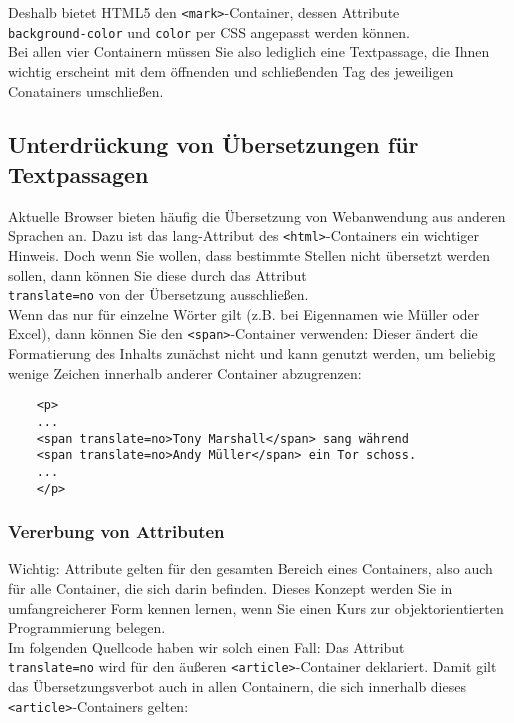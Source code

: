 Deshalb bietet HTML5 den \verb|<mark>|-Container, dessen \glqq{}Attribute\grqq{} \\\verb|background-color| und \verb|color| per CSS angepasst werden können. \\

Bei allen vier Containern müssen Sie also lediglich eine Textpassage, die Ihnen wichtig erscheint mit dem öffnenden und schließenden Tag des jeweiligen Conatainers umschließen.

\subsection{Unterdrückung von Übersetzungen für Textpassagen}

Aktuelle Browser bieten häufig die Übersetzung von Webanwendung aus anderen Sprachen an. Dazu ist das lang-Attribut des \verb|<html>|-Containers ein wichtiger Hinweis. Doch wenn Sie wollen, dass bestimmte Stellen nicht übersetzt werden sollen, dann können Sie diese durch das Attribut \\\verb|translate=no| von der Übersetzung ausschließen.\\

Wenn das nur für einzelne Wörter gilt (z.B. bei Eigennamen wie Müller oder Excel), dann können Sie den \verb|<span>|-Container verwenden: Dieser ändert die Formatierung des Inhalts zunächst nicht und kann genutzt werden, um beliebig wenige Zeichen innerhalb anderer Container abzugrenzen:

\begin{verbatim}
	<p> 
	... 
	<span translate=no>Tony Marshall</span> sang während 
	<span translate=no>Andy Müller</span> ein Tor schoss. 
	...
	</p>
\end{verbatim}

\subsubsection{Vererbung von Attributen}

Wichtig: Attribute gelten für den gesamten Bereich eines Containers, also auch für alle Container, die sich darin befinden. Dieses Konzept werden Sie in umfangreicherer Form kennen lernen, wenn Sie einen Kurs zur objektorientierten Programmierung belegen.\\

Im folgenden Quellcode haben wir solch einen Fall: Das Attribut\\ \verb|translate=no| wird für den äußeren \verb|<article>|-Container deklariert. Damit gilt das Übersetzungsverbot auch in allen Containern, die sich innerhalb dieses \verb|<article>|-Containers gelten:

